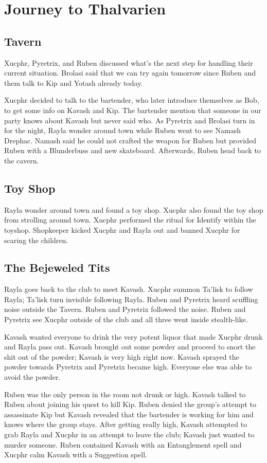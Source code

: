 \chapter*{Journey to Thalvarien}
\section{Tavern}

 Xucphr, Pyretrix,
and Ruben discussed what’s the next step for
handling their current situation. Brolasi said
that we can try again tomorrow since Ruben and
them talk to Kip and Yotash already today.

Xucphr decided to talk to the bartender, who
later introduce themselves as Bob, to get some
info on Kavash and Kip. The bartender mention
that someone in our party knows about Kavash
but never said who. As Pyretrix and Brolasi turn
in for the night, Rayla wonder around town while
Ruben went to see Namash Drephac. Namash
said he could not crafted the weapon for Ruben
but provided Ruben with a Blunderbuss and
new skateboard. Afterwards, Ruben head back
to the cavern.

\section{Toy Shop}
Rayla wonder around town and found a toy shop.
Xucphr also found the toy shop from strolling
around town. Xucphr performed the ritual for
Identify within the toyshop. Shopkeeper kicked
Xucphr and Rayla out and banned Xucphr for
scaring the children.

\section{The Bejeweled Tits}
Rayla goes back to the club to meet Kavash.
Xucphr summon Ta’lisk to follow Rayla; Ta’lisk
turn invisible following Rayla. Ruben and
Pyretrix heard scuffling noise outside the Tavern.
Ruben and Pyretrix followed the noise. Ruben
and Pyretrix see Xucphr outside of the club and
all three went inside stealth-like.

Kavash wanted everyone to drink the very
potent liquor that made Xucphr drunk and
Rayla pass out. Kavash brought out some powder
and proceed to snort the shit out of the powder;
Kavash is very high right now. Kavash sprayed
the powder towards Pyretrix and Pyretrix became
high. Everyone else was able to avoid the
powder.

Ruben was the only person in the room not
drunk or high. Kavash talked to Ruben about
joining his quest to kill Kip. Ruben denied the
group’s attempt to assassinate Kip but Kavash
revealed that the bartender is working for him
and knows where the group stays. After getting
really high, Kavash attempted to grab Rayla and
Xucphr in an attempt to leave the club; Kavash
just wanted to murder someone. Ruben
contained Kavash with an Entanglement spell
and Xucphr calm Kavash with a Suggestion
spell.

